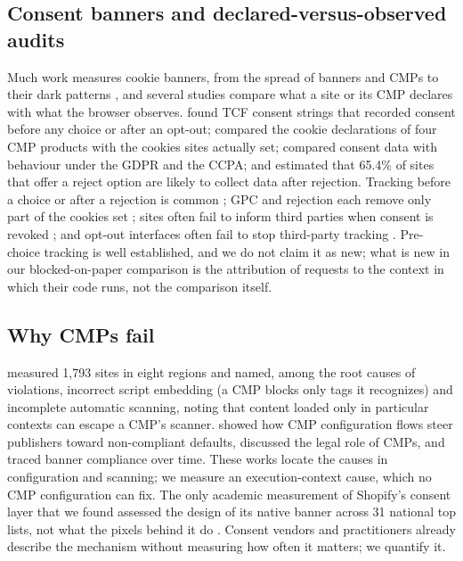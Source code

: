 \subsection*{Consent banners and declared-versus-observed audits}
Much work measures cookie banners, from the spread of banners and CMPs \citep{degeling2019value,hils2020emergence,kretschmer2021cookie,trevisan2019cookie,sanchezrola2019optout,woods2022commodification} to their dark patterns \citep{nouwens2020dark,berens2024cookie}, and several studies compare what a site or its CMP declares with what the browser observes. \citet{matte2020banners} found TCF consent strings that recorded consent before any choice or after an opt-out; \citet{bollinger2022automating} compared the cookie declarations of four CMP products with the cookies sites actually set; \citet{zhang2024cschecker} compared consent data with behaviour under the GDPR and the CCPA; and \citet{bouhoula2024automated} estimated that 65.4\% of sites that offer a reject option are likely to collect data after rejection. Tracking before a choice or after a rejection is common \citep{papadogiannakis2021post,martinez2022compliance}; GPC and rejection each remove only part of the cookies set \citep{rasaii2025intractable}; sites often fail to inform third parties when consent is revoked \citep{kancherla2025revoke}; and opt-out interfaces often fail to stop third-party tracking \citep{singh2026umbra}. Pre-choice tracking is well established, and we do not claim it as new; what is new in our blocked-on-paper comparison is the attribution of requests to the context in which their code runs, not the comparison itself.

\subsection*{Why CMPs fail}
\citet{tang2025navigating} measured 1,793 sites in eight regions and named, among the root causes of violations, incorrect script embedding (a CMP blocks only tags it recognizes) and incomplete automatic scanning, noting that content loaded only in particular contexts can escape a CMP's scanner. \citet{toth2022dark} showed how CMP configuration flows steer publishers toward non-compliant defaults, \citet{santos2021cmp} discussed the legal role of CMPs, and \citet{dimova2026history} traced banner compliance over time. These works locate the causes in configuration and scanning; we measure an execution-context cause, which no CMP configuration can fix. The only academic measurement of Shopify's consent layer that we found assessed the design of its native banner across 31 national top lists, not what the pixels behind it do \citep{nouwens2025crosscountry}. Consent vendors and practitioners already describe the mechanism \citep{truevault_apppixel,onetrust_ecommerce,pandectes_blocking,analyticsninja2025pixels,weltpixel2026race} without measuring how often it matters; we quantify it.

